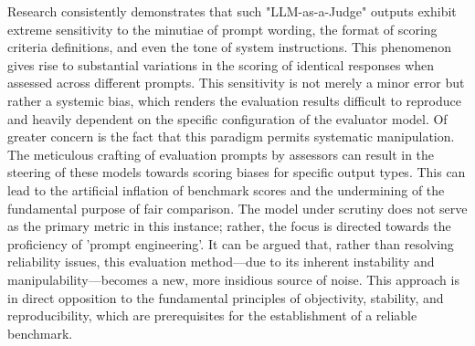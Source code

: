 Research consistently demonstrates that such "LLM-as-a-Judge" outputs exhibit extreme sensitivity to the minutiae of prompt wording, the format of scoring criteria definitions, and even the tone of system instructions\cite{li2025generation}\cite{zheng2023judging}\cite{szymanski2025limitations}. This phenomenon gives rise to substantial variations in the scoring of identical responses when assessed across different prompts\cite{he2024does}. This sensitivity is not merely a minor error but rather a systemic bias, which renders the evaluation results difficult to reproduce and heavily dependent on the specific configuration of the evaluator model\cite{perlitz2024benchmark}\cite{banerjee2024vulnerability}. Of greater concern is the fact that this paradigm permits systematic manipulation\cite{zhou2023don}. The meticulous crafting of evaluation prompts by assessors can result in the steering of these models towards scoring biases for specific output types\cite{dietz2025llm}. This can lead to the artificial inflation of benchmark scores and the undermining of the fundamental purpose of fair comparison. The model under scrutiny does not serve as the primary metric in this instance; rather, the focus is directed towards the proficiency of 'prompt engineering'\cite{bruni2025benchmarking}\cite{liang2025much}. It can be argued that, rather than resolving reliability issues, this evaluation method—due to its inherent instability and manipulability—becomes a new, more insidious source of noise\cite{feuer2025judgment}. This approach is in direct opposition to the fundamental principles of objectivity, stability, and reproducibility, which are prerequisites for the establishment of a reliable benchmark.

